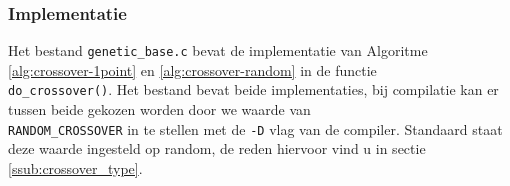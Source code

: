

\subsubsection{Implementatie}
Het bestand \texttt{genetic\_base.c} bevat de implementatie van Algoritme \ref{alg:crossover-1point} en \ref{alg:crossover-random} in de functie 
\\ \texttt{do\_crossover()}. 
Het bestand bevat beide implementaties, bij compilatie kan er tussen beide gekozen worden door we waarde van \\ \texttt{RANDOM\_CROSSOVER} in te stellen met de \texttt{-D} vlag van de compiler. Standaard staat deze waarde ingesteld op random, de reden hiervoor vind u in sectie \ref{ssub:crossover_type}.


%